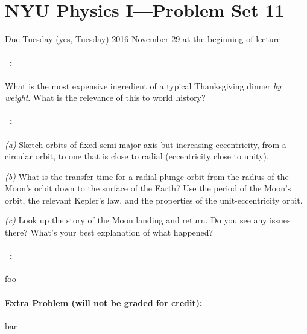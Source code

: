 \documentclass[12pt]{article}
\begin{document}
\section*{NYU Physics I---Problem Set 11}

Due Tuesday (yes, Tuesday) 2016 November 29 at the beginning of lecture.

\paragraph{\problemname~\theproblem:}%
What is the most expensive ingredient of a typical Thanksgiving dinner \emph{by weight}.
What is the relevance of this to world history?

\paragraph{\problemname~\theproblem:}%
\textsl{(a)} Sketch orbits of fixed semi-major axis but increasing
eccentricity, from a circular orbit, to one that is close to radial
(eccentricity close to unity).

\textsl{(b)} What is the transfer time for a radial plunge orbit
from the radius of the Moon's orbit down to the surface of the Earth?
Use the period of the Moon's orbit, the relevant  Kepler's law, and
the properties of the unit-eccentricity orbit.

\textsl{(c)} Look up the story of the Moon landing and return.
Do you see any issues there? What's your best explanation of what
happened?

\paragraph{\problemname~\theproblem:}%
foo

\paragraph{Extra Problem (will not be graded for credit):}%
bar
\end{document}
